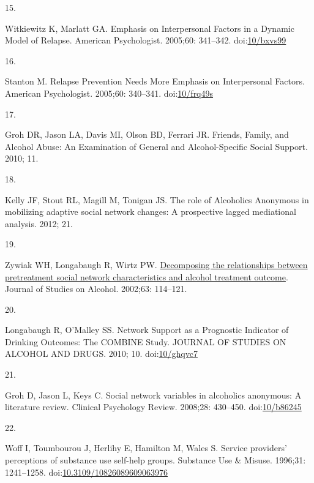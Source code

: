 \documentclass[
  letterpaper,
  DIV=11,
  numbers=noendperiod]{scrartcl}
\newlength{\cslhangindent}
\newlength{\csllabelwidth}
\newenvironment{CSLReferences}[2] %
 {\begin{list}{}{%
  \setlength{\itemindent}{0pt}
  \setlength{\leftmargin}{0pt}
  \setlength{\parsep}{0pt}
  \ifodd #1
   \setlength{\leftmargin}{\cslhangindent}
   \setlength{\itemindent}{-1\cslhangindent}
  \fi
  \setlength{\itemsep}{#2\baselineskip}}}
 {\end{list}}
\newcommand{\CSLLeftMargin}[1]{\parbox[t]{\csllabelwidth}{\strut#1\strut}}
\newcommand{\CSLRightInline}[1]{\parbox[t]{\linewidth - \csllabelwidth}{\strut#1\strut}}
\begin{document}
\begin{CSLReferences}{0}{1}
\CSLLeftMargin{15. }%
\CSLRightInline{Witkiewitz K, Marlatt GA. Emphasis on {Interpersonal
Factors} in a {Dynamic Model} of {Relapse}. American Psychologist.
2005;60: 341--342. doi:\href{https://doi.org/10/bxvs99}{10/bxvs99}}

\CSLLeftMargin{16. }%
\CSLRightInline{Stanton M. Relapse {Prevention Needs More Emphasis} on
{Interpersonal Factors}. American Psychologist. 2005;60: 340--341.
doi:\href{https://doi.org/10/frq49s}{10/frq49s}}

\CSLLeftMargin{17. }%
\CSLRightInline{Groh DR, Jason LA, Davis MI, Olson BD, Ferrari JR.
Friends, {Family}, and {Alcohol Abuse}: {An Examination} of {General}
and {Alcohol-Specific Social Support}. 2010; 11. }

\CSLLeftMargin{18. }%
\CSLRightInline{Kelly JF, Stout RL, Magill M, Tonigan JS. The role of
{Alcoholics Anonymous} in mobilizing adaptive social network changes:
{A} prospective lagged mediational analysis. 2012; 21. }

\CSLLeftMargin{19. }%
\CSLRightInline{Zywiak WH, Longabaugh R, Wirtz PW.
\href{https://www.ncbi.nlm.nih.gov/pubmed/11925053}{Decomposing the
relationships between pretreatment social network characteristics and
alcohol treatment outcome}. Journal of Studies on Alcohol. 2002;63:
114--121. }

\CSLLeftMargin{20. }%
\CSLRightInline{Longabaugh R, O'Malley SS. Network {Support} as a
{Prognostic Indicator} of {Drinking Outcomes}: {The COMBINE Study}.
JOURNAL OF STUDIES ON ALCOHOL AND DRUGS. 2010; 10.
doi:\href{https://doi.org/10/ghqvc7}{10/ghqvc7}}

\CSLLeftMargin{21. }%
\CSLRightInline{Groh D, Jason L, Keys C. Social network variables in
alcoholics anonymous: {A} literature review. Clinical Psychology Review.
2008;28: 430--450. doi:\href{https://doi.org/10/b86245}{10/b86245}}

\CSLLeftMargin{22. }%
\CSLRightInline{Woff I, Toumbourou J, Herlihy E, Hamilton M, Wales S.
Service providers' perceptions of substance use self-help groups.
Substance Use \& Misuse. 1996;31: 1241--1258.
doi:\href{https://doi.org/10.3109/10826089609063976}{10.3109/10826089609063976}}


\end{CSLReferences}
\end{document}
